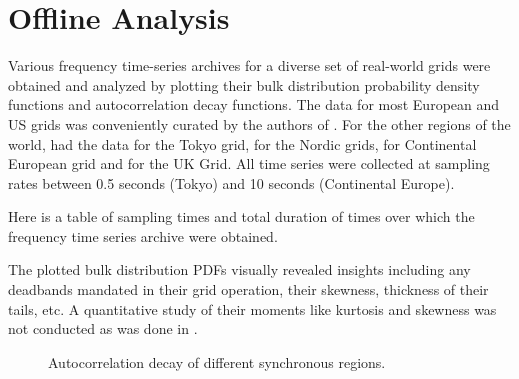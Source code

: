 \section[Offline/Postmortem Analysis]{Offline Analysis}
\label{sec:offline}

Various frequency time-series archives for a diverse set of real-world grids were obtained and analyzed by plotting their bulk distribution probability density functions and autocorrelation decay functions. The data for most European and US grids was conveniently curated by the authors of \cite{lrydin01, lrydinGithub}. For the other regions of the world, \cite{tokyo2017, tokyo2020} had the data for the Tokyo grid, \cite{nordic2018, nordic2019} for the Nordic grids, \cite{ce2019, ce2020} for Continental European grid and \cite{ukNationalGridESOData} for the UK Grid.
All time series were collected at sampling rates between 0.5 seconds (Tokyo) and 10 seconds (Continental Europe).

Here is a table of sampling times and total duration of times over which the frequency time series archive were obtained.

\renewcommand{\arraystretch}{1.0}



The plotted bulk distribution PDFs visually revealed insights including any deadbands \cite{francesca01, vorobev01} mandated in their grid operation, their skewness, thickness of their tails, etc. A quantitative study of their moments like kurtosis and skewness was not conducted as was done in \cite{schafer01}.

%	

\begin{figure}[ht]
	\centering
	\caption{Autocorrelation decay of different synchronous regions.}
	\label{fig:comp5}
\end{figure}

